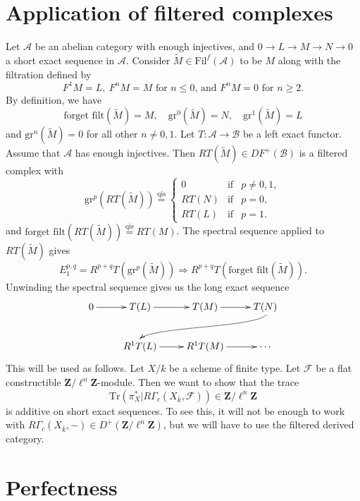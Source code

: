 \section{Application of filtered complexes}
\label{section-applications-filtered}

\noindent
Let $\mathcal{A}$ be an abelian category with enough injectives, and
$0 \to L \to M \to N \to 0$ a short exact sequence in $\mathcal{A}$.
Consider $\widetilde M \in \text{Fil}^f(\mathcal{A})$ to be $M$ along with the
filtration defined by
$$
F^1M = L, \ F^nM = M
\text{ for $n \leq 0$, and $F^nM = 0$ for $n \geq 2$.}
$$
By definition, we have
$$
\text{forget filt}(\widetilde M) = M, \quad
\text{gr}^0(\widetilde M) = N, \quad
\text{gr}^1(\widetilde M) = L
$$
and $\text{gr}^n(\widetilde M) = 0$ for all other $n \neq 0,1$. Let $T:
\mathcal{A} \to \mathcal{B}$ be a left exact functor. Assume that $\mathcal{A}$
has enough injectives. Then $RT(\widetilde M) \in D F^+(\mathcal{B})$ is a
filtered complex with
$$
\text{gr}^p(RT(\widetilde M)) \stackrel {\mathrm{qis}}{=} \left \{
\begin{matrix}
0 & \text{if} & p \neq 0,1, \\
RT(N) & \text{if} & p = 0, \\
RT(L) & \text{if} & p = 1.
\end{matrix}
\right .
$$
and $\text{forget filt}(RT(\widetilde M))\stackrel{\text{qis}}{ = } RT(M)$. The
spectral sequence applied to $RT(\widetilde M)$ gives
$$
E_1^{p,q} = R^{p+q}T(\mathrm{gr}^p(\widetilde M)) \Rightarrow
R^{p+q}T(\text{forget filt}(\widetilde M)).
$$
Unwinding the spectral sequence gives us the long exact sequence
$$
\xymatrix{
0 \ar[r] & T(L) \ar[r] & T(M) \ar[r] & T(N) \ar@(rd,ul)[rdllllr] \\
& R^1T(L) \ar[r] & R^1T(M) \ar[r] & \cdots
}
$$
This will be used as follows. Let $X/k$ be a scheme of finite type. Let
$\mathcal{F}$ be a flat constructible $\mathbf{Z}/\ell^n \mathbf{Z}$-module.
Then we want to show that the trace
$$
\text{Tr}( \pi_X^\ast | R\Gamma_c(X_{\bar k}, \mathcal{F})) \in
\mathbf{Z}/\ell^n \mathbf{Z}
$$
is additive on short exact sequences. To see this, it will not be enough to
work with $R\Gamma_c(X_{\bar k}, -) \in D^+(\mathbf{Z}/\ell^n \mathbf{Z})$, but
we will have to use the filtered derived category.







\section{Perfectness}
\label{section-perfect}

